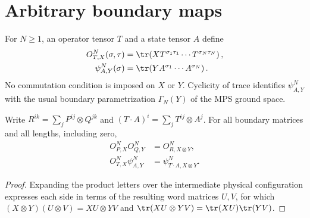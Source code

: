 
\section{Arbitrary boundary maps}
\label{sec:mpo_boundary_transport}

For $N\geq1$, an operator tensor $T$ and a state tensor $A$ define
\begin{align}
    O^N_{T,X}(\sigma,\tau)
     & =\tr\!\left(XT^{\sigma_1\tau_1}\cdots T^{\sigma_N\tau_N}\right),
    \label{eq:glm_boundary_operator}                                    \\
    \psi^N_{A,Y}(\sigma)
     & =\tr\!\left(YA^{\sigma_1}\cdots A^{\sigma_N}\right).
    \label{eq:glm_boundary_state}
\end{align}
No commutation condition is imposed on $X$ or $Y$. Cyclicity of trace
identifies $\psi^N_{A,Y}$ with the usual boundary parametrization
$\Gamma_N(Y)$ of the MPS ground space.

\begin{lemma}
    \label{thm:glm_boundary_stack}
    \leanok
    Write $R^{ik}=\sum_jP^{ij}\otimes Q^{jk}$ and
    $(T\cdot A)^i=\sum_jT^{ij}\otimes A^j$.
    For all boundary matrices and all lengths, including zero,
    \begin{align}
        O^N_{P,X}O^N_{Q,Y}    & =O^N_{R,X\otimes Y},
        \label{eq:glm_boundary_stack}                          \\
        O^N_{T,X}\psi^N_{A,Y} & =\psi^N_{T\cdot A,X\otimes Y}.
        \label{eq:glm_boundary_action}
    \end{align}
\end{lemma}
\begin{proof}
    \leanok
    Expanding the product letters over the intermediate physical configuration
    expresses each side in terms of the resulting word matrices $U,V$, for
    which $(X\otimes Y)(U\otimes V)=XU\otimes YV$ and
    $\tr(XU\otimes YV)=\tr(XU)\tr(YV)$.
\end{proof}

